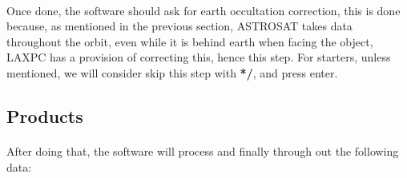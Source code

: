 \documentclass[a4paper,twoside]{report}
\numberwithin{equation}{section}
\begin{document}
\paragraph{}
Once done, the software should ask for earth occultation correction, this is done because, as mentioned in the previous section, ASTROSAT takes data throughout the orbit, even while it is behind earth when facing the object, LAXPC has a provision of correcting this, hence this step. For starters, unless mentioned, we will consider skip this step with \textbf{*/}, and press enter. 
\subsection{Products}
\paragraph{}
After doing that, the software will process and finally through out the following data:
\end{document}
